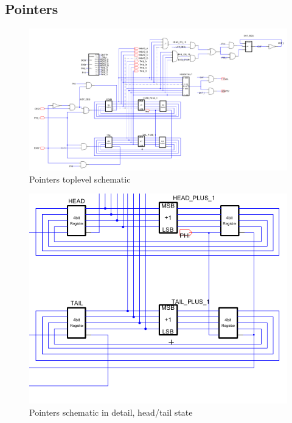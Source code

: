 \documentclass[12pt]{report}
\begin{document}
\subsection*{Pointers}
\begin{figure}[H]
  \centering
    \includegraphics[width=1.0\textwidth]{Schematics/pointers_schematic.PNG}
  \caption{Pointers toplevel schematic}
  \label{fig:pointers_schematic}
\end{figure}
\begin{figure}[H]
  \centering
    \includegraphics[width=1.0\textwidth]{Schematics/pointers_head_tail_state_schematic.PNG}
  \caption{Pointers schematic in detail, head/tail state}
  \label{fig:pointers_head_tail_state_schematic}
\end{figure}
\end{document}

